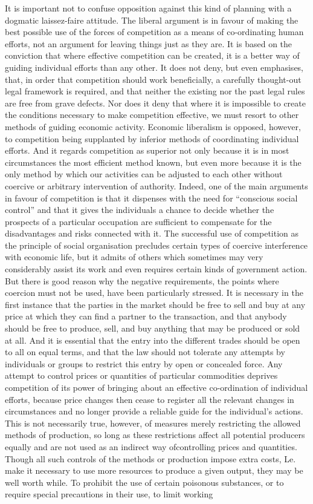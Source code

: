 \documentclass[11pt,openany]{book}
\begin{document}
It is important not to confuse opposition against this kind of planning with a dogmatic laissez-faire attitude. The liberal argument is in favour of making the best possible use of the forces of competition as a means of co-ordinating human efforts, not an argument for leaving things just as they are. It is based on the conviction that where effective competition can be created, it is a better way of guiding individual efforts than any other. It does not deny, but even emphasises, that, in order that competition should work beneficially, a carefully thought-out legal framework is required, and that neither the existing nor the past legal rules are free from grave defects. Nor does it deny that where it is impossible to create the conditions necessary to make competition effective, we must resort to other methods of guiding economic activity. Economic liberalism is opposed, however, to competition being supplanted by inferior methods of coordinating individual efforts. And it regards competition as superior not only because it is in most circumstances the most efficient method known, but even more because it is the only method by which our activities can be adjusted to each other without coercive or arbitrary intervention of authority. Indeed, one of the main arguments in favour of competition is that it dispenses with the need for ``conscious social control'' and that it gives the individuals a chance to decide whether the prospects of a particular occupation are sufficient to compensate for the disadvantages and risks connected with it. The successful use of competition as the principle of social organisation precludes certain types of coercive interference with economic life, but it admits of others which sometimes may very considerably assist its work and even requires certain kinds of government action. But there is good reason why the negative requirements, the points where coercion must not be used, have been particularly stressed. It is necessary in the first instance that the parties in the market should be free to sell and buy at any price at which they can find a partner to the transaction, and that anybody should be free to produce, sell, and buy anything that may be produced or sold at all. And it is essential that the entry into the different trades should be open to all on equal terms, and that the law should not tolerate any attempts by individuals or groups to restrict this entry by open or concealed force. Any attempt to control prices or quantities of particular commodities deprives competition of its power of bringing about an effective co-ordination of individual efforts, because price changes then cease to register all the relevant changes in circumstances and no longer provide a reliable guide for the individual's actions. This is not necessarily true, however, of measures merely restricting the allowed methods of production, so long as these restrictions affect all potential producers equally and are not used as an indirect way ofcontrolling prices and quantities. Though all such controls of the methods or production impose extra costs, Le. make it necessary to use more resources to produce a given output, they may be well worth while. To prohibit the use of certain poisonous substances, or to require special precautions in their use, to limit working 
\end{document}
